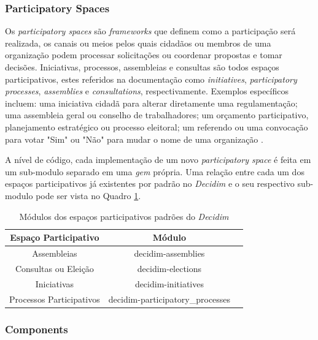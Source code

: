 \subsubsection{Participatory Spaces}

Os \textit{participatory spaces} são \textit{frameworks} que definem como a participação será realizada, os canais ou meios pelos quais cidadãos ou membros de uma organização podem processar solicitações ou coordenar propostas e tomar decisões. Iniciativas, processos, assembleias e consultas são todos espaços participativos, estes referidos na documentação como \textit{initiatives}, \textit{participatory processes}, \textit{assemblies} e \textit{consultations}, respectivamente. Exemplos específicos incluem: uma iniciativa cidadã para alterar diretamente uma regulamentação; uma assembleia geral ou conselho de trabalhadores; um orçamento participativo, planejamento estratégico ou processo eleitoral; um referendo ou uma convocação para votar "Sim" ou "Não" para mudar o nome de uma organização \cite{decidim-descriptionpage}.

A nível de código, cada implementação de um novo \textit{participatory space} é feita em um sub-modulo separado em uma \textit{gem} própria. Uma relação entre cada um dos espaços participativos já existentes por padrão no \textit{Decidim} e o seu respectivo sub-modulo pode ser vista no Quadro \ref{tab:modulos-participatoryspaces}.

\begin{table}
  \centering
  \caption{Módulos dos espaços participativos padrões do \textit{Decidim}}
  \label{tab:modulos-participatoryspaces}
  \begin{tabular}{|c|c|c|}
    \hline
    Espaço Participativo & Módulo \\
    \hline
    Assembleias & decidim-assemblies \\
    Consultas ou Eleição & decidim-elections \\
    Iniciativas & decidim-initiatives \\
    Processos Participativos & decidim-participatory\_processes \\
    \hline
  \end{tabular}
\end{table}

\subsubsection{Components}

